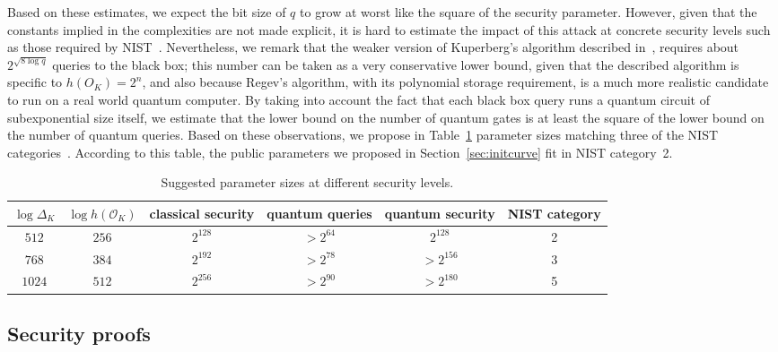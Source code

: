 \documentclass{llncs}
\renewcommand{\O}{\mathcal{O}}
\begin{document}
Based on these estimates, we expect the bit size of $q$ to grow at
worst like the square of the security parameter. However, given that
the constants implied in the complexities are not made explicit, it is
hard to estimate the impact of this attack at concrete security levels
such as those required by NIST~\cite{NIST2016}. Nevertheless, we
remark that the weaker version of Kuperberg's algorithm described
in~\cite[§2.1]{regev04}, requires about $2^{\sqrt{8\log q}}$ queries
to the black box; this number can be taken as a very conservative
lower bound, given that the described algorithm is specific to
$h(O_K)=2^n$, and also because Regev's algorithm, with its polynomial
storage requirement, is a much more realistic candidate to run on a
real world quantum computer. By taking into account the fact that each
black box query runs a quantum circuit of subexponential size itself,
we estimate that the lower bound on the number of quantum gates is at
least the square of the lower bound on the number of quantum
queries. Based on these observations, we propose in
Table~\ref{tab:sizes} parameter sizes matching three of the NIST
categories~\cite{NIST2016}.
According to this table, the public parameters we proposed
in Section~\ref{sec:initcurve} fit in NIST category~2.

\begin{table}
    \renewcommand{\arraystretch}{1.4}
    \centering
    \begin{tabular}{c@{\;}|@{\;}c@{\;}|@{\;}c@{\;}|@{\;}c@{\;}|@{\;}c@{\;}|@{\;}c}
        $\log Δ_K$ & $\log h(\O_K)$
        & \parbox{10ex}{\centering classical security}
        & \parbox{10ex}{\centering quantum queries}
        & \parbox{10ex}{\centering quantum security}
        & \parbox{10ex}{\centering NIST category}\\
        \hline
        $512$  & $256$ & $2^{128}$ & $> 2^{64}$ & $2^{128}$ & 2\\
        $768$  & $384$ & $2^{192}$ & $> 2^{78}$ & $> 2^{156}$ & 3\\
        $1024$ & $512$ & $2^{256}$ & $> 2^{90}$ & $> 2^{180}$ & 5
        \\
        \hline
    \end{tabular}
    \smallskip
    \caption{Suggested parameter sizes at different security levels.}
    \label{tab:sizes}
\end{table}

\subsection{Security proofs}
\label{sec:proofs}
\end{document}
